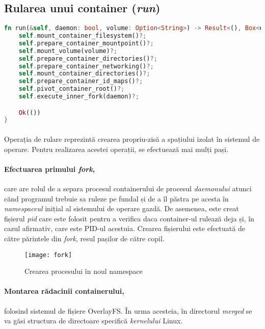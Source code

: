         \subsection{Rularea unui container (\textit{run})} \label{section:run}
            \begin{lstlisting}[language=Rust, style=boxed, caption={Rularea unui container},captionpos=b]
fn run(&self, daemon: bool, volume: Option<String>) -> Result<(), Box<dyn std::error::Error>> {
    self.mount_container_filesystem()?;
    self.prepare_container_mountpoint()?;
    self.mount_volume(volume)?;
    self.prepare_container_directories()?;
    self.prepare_container_networking()?;
    self.mount_container_directories()?;
    self.prepare_container_id_maps()?;
    self.pivot_container_root()?;
    self.execute_inner_fork(daemon)?;

    Ok(())
}           \end{lstlisting}
            \label{fig:cod_crun}
            \paragraph{} Operația de rulare reprezintă crearea propriu-zisă a spațiului izolat în sistemul de operare. Pentru realizarea acestei operații, se efectuează mai mulți pași.
            \paragraph{Efectuarea primului \textit{fork},} care are rolul de a separa procesul containerului de procesul \textit{daemonului} atunci cănd programul trebuie sa ruleze pe fundal și de a îl păstra pe acesta în \textit{namespaceul} inițial al sistemului de operare gazdă. De asemenea, este creat fișierul \textit{pid} care este folosit pentru a verifica daca container-ul rulează deja și, în cazul afirmativ, care este PID-ul acestuia. Crearea fișierului este efectuată de către părintele din \textit{fork}, resul pașilor de către copil.
                \begin{figure}[h!]
                    \centering
                    \texttt{[image: fork]}
                    \caption{Crearea procesului în noul namespace}
                    \label{fig:fork}
                \end{figure}
            \paragraph{Montarea rădacinii containerului,} folosind sistemul de fișiere OverlayFS. În urma acesteia, în directorul \textit{merged} se va găsi structura de directoare specifică \textit{kernelului} Linux.
